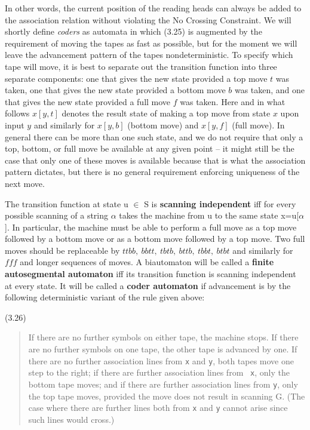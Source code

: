 \noindent
In other words, the current position of the reading heads can always be added
to the association relation without violating the No Crossing Constraint. We
will shortly define {\it coders} as automata in which (3.25) is augmented by
the requirement of moving the tapes as fast as possible, but for the moment we
will leave the advancement pattern of the tapes nondeterministic. To specify
which tape will move, it is best to separate out the transition function into
three separate components: one that gives the new state provided a top move
$t$ was taken, one that gives the new state provided a bottom move $b$ was
taken, and one that gives the new state provided a full move $f$ was
taken. Here and in what follows $x[y,t]$ denotes the result state of making a
top move from state $x$ upon input $y$ and similarly for $x[y,b]$ (bottom
move) and $x[y,f]$ (full move).  In general there can be more than one such
state, and we do not require that only a top, bottom, or full move be
available at any given point -- it might still be the case that only one of
these moves is available because that is what the association pattern
dictates, but there is no general requirement enforcing uniqueness of the
next move.

The transition function at state u $\in$ S is {\bf scanning independent} 
 iff for every possible scanning of a string 
$\alpha$ takes the machine from u to the same state x=u[$\alpha$]. In
particular, the machine must be able to perform a full move as a top move
followed by a bottom move or as a bottom move followed by a top move. Two
full moves should be replaceable by $ttbb,\ bbtt,\ tbtb,\ bttb,\ tbbt,\ btbt$
and similarly for $fff$ and longer sequences of moves. A biautomaton will be
called a {\bf finite autosegmental automaton} iff its transition function is
scanning independent at every state. It will be called a {\bf coder automaton}
if advancement is by the following deterministic variant of the rule given
above:  

\hfill (3.26)
\begin{quote}
If there are no further symbols on either tape, the machine stops. If there
are no further symbols on one tape, the other tape is advanced by one.  If
there are no further association lines from {\tt x} and {\tt y}, both tapes
move one step to the right; if there are further association lines from {\tt
x}, only the bottom tape moves; and if there are further association lines
from {\tt y}, only the top tape moves, provided the move does not result in
scanning G. (The case where there are further lines both from {\tt x}
and {\tt y} cannot arise since such lines would cross.)
\end{quote}

